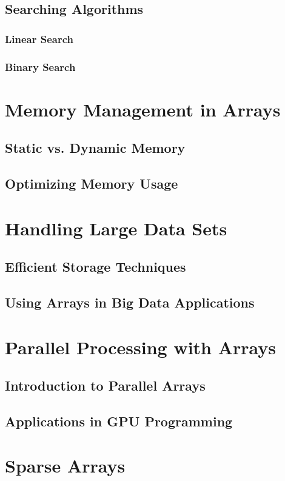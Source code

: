 \documentclass[12pt, oneside]{book}
\begin{document}
	\subsection{Searching Algorithms}
	\subsubsection{Linear Search}
	\subsubsection{Binary Search}
	
	\section{Memory Management in Arrays}
	\subsection{Static vs. Dynamic Memory}
	\subsection{Optimizing Memory Usage}
	
	\section{Handling Large Data Sets}
	\subsection{Efficient Storage Techniques}
	\subsection{Using Arrays in Big Data Applications}
	
	\section{Parallel Processing with Arrays}
	\subsection{Introduction to Parallel Arrays}
	\subsection{Applications in GPU Programming}
	
	\section{Sparse Arrays}
\end{document}
